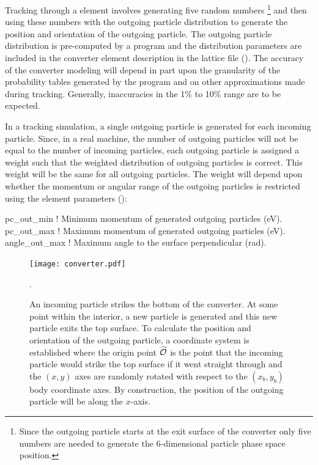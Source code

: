 Tracking through a  element involves generating five random numbers
  \footnote{
Since the outgoing particle starts at the exit surface of the converter only five numbers
are needed to generate the 6-dimensional particle phase space position.
  }
and then using these numbers with the outgoing particle distribution to generate the position and
orientation of the outgoing particle. The outgoing particle distribution is pre-computed by a
program  and the distribution parameters are included in the
converter element description in the \bmad lattice file (). The accuracy of the
converter modeling will depend in part upon the granularity of the probability tables generated
by the  program and on other approximations made during
tracking. Generally, inaccuracies in the 1\% to 10\% range are to be expected.

In a tracking simulation, a single outgoing particle is generated for each incoming particle. Since,
in a real machine, the number of outgoing particles will not be equal to the number of incoming
particles, each outgoing particle is assigned a weight such that the weighted distribution of
outgoing particles is correct. This weight will be the same for all outgoing particles. The weight
will depend upon whether the momentum or angular range of the outgoing particles is restricted using
the element parameters ():
\begin{example}
  pc_out_min    ! Minimum momentum of generated outgoing particles (eV).
  pc_out_max    ! Maximum momentum of generated outgoing particles (eV).
  angle_out_max ! Maximum angle to the surface perpendicular (rad).
\end{example}


\begin{figure}[tb]
  \centering
  \texttt{[image: converter.pdf]}
  \caption[Converter geometry.]
  {
An incoming particle strikes the bottom of the converter. At some point within the interior, a new
particle is generated and this new particle exits the top surface. To calculate the position and
orientation of the outgoing particle, a coordinate system is established where the origin point
$\widetilde{{\cal O}}$ is the point that the incoming particle would strike the top surface if it went straight
through and the $(x,y)$ axes are randomly rotated with respect to the $(x_b,y_b)$ body coordinate axes.
By construction, the position of the outgoing particle will be along the $x$-axis.
  }
  \label{f:converter}.
\end{figure}


